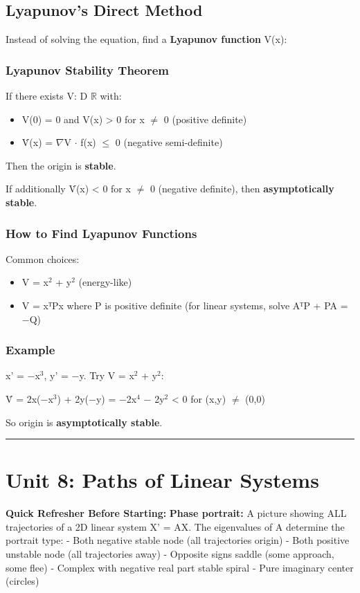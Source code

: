 \documentclass[12pt,a4paper,openany]{book}
\begin{document}
{{\subsection{Lyapunov's Direct Method }

Instead of solving the equation, find a \textbf{Lyapunov function} V(x):

\subsubsection{Lyapunov Stability Theorem}
If there exists V: D  $\mathbb{R}$ with:
\begin{itemize}
  \item V(0) = 0 and V(x) > 0 for x $\neq$ 0 (positive definite)
  \item V̇(x) = $\nabla$V $\cdot$ f(x) $\leq$ 0 (negative semi-definite)
\end{itemize}

Then the origin is \textbf{stable}.

If additionally V̇(x) < 0 for x $\neq$ 0 (negative definite), then \textbf{asymptotically stable}.

\subsubsection{How to Find Lyapunov Functions}
Common choices:
\begin{itemize}[leftmargin=*]
  \item V = x$^2$ + y$^2$ (energy-like)
  \item V = xᵀPx where P is positive definite (for linear systems, solve AᵀP + PA = −Q)
\end{itemize}

\subsubsection{Example}
x' = −x$^3$, y' = −y. Try V = x$^2$ + y$^2$:

V̇ = 2x(−x$^3$) + 2y(−y) = −2x$^4$ − 2y$^2$ < 0 for (x,y) $\neq$ (0,0)

So origin is \textbf{asymptotically stable}. 

\bigskip\noindent\rule{\textwidth}{0.4pt}\bigskip

\section{Unit 8: Paths of Linear Systems}

\begin{prereqbox}
 \textbf{Quick Refresher Before Starting:}
\textbf{Phase portrait:} A picture showing ALL trajectories of a 2D linear system X' = AX.
The eigenvalues of A determine the portrait type:
- Both negative  stable node (all trajectories  origin)
- Both positive  unstable node (all trajectories  away)
- Opposite signs  saddle (some approach, some flee)
- Complex with negative real part  stable spiral
- Pure imaginary  center (circles)
\end{prereqbox}


}}
\end{document}
